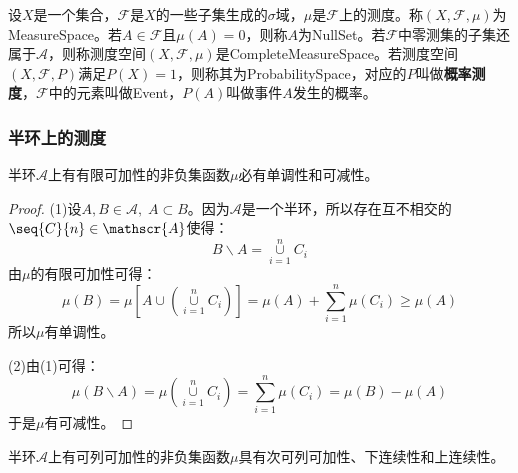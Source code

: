 \begin{definition}
	设$X$是一个集合，$\mathscr{F}$是$X$的一些子集生成的$\sigma$域，$\mu$是$\mathscr{F}$上的测度。称$(X,\mathscr{F},\mu)$为\gls{MeasureSpace}。若$A\in \mathscr{F}$且$\mu(A)=0$，则称$A$为\gls{NullSet}。若$\mathscr{F}$中零测集的子集还属于$\mathscr{A}$，则称测度空间$(X,\mathscr{F},\mu)$是\gls{CompleteMeasureSpace}。若测度空间$(X,\mathscr{F},P)$满足$P(X)=1$，则称其为\gls{ProbabilitySpace}，对应的$P$叫做\textbf{概率测度}，$\mathscr{F}$中的元素叫做\gls{Event}，$P(A)$叫做事件$A$发生的概率。
\end{definition}
\subsubsection{半环上的测度}
\begin{theorem}\label{theo:SemiringFiniteAdditivitySetfunction}
	半环$\mathscr{A}$上有有限可加性的非负集函数$\mu$必有单调性和可减性。
\end{theorem}
\begin{proof}
	(1)设$A,B\in\mathscr{A},\;A\subset B$。因为$\mathscr{A}$是一个半环，所以存在互不相交的$\seq{C}{n}\in \mathscr{A}$使得：
	\begin{equation*}
		B\backslash A=\underset{i=1}{\overset{n}{\cup}}C_i
	\end{equation*}
	由$\mu$的有限可加性可得：
	\begin{equation*}
		\mu(B)=\mu\left[A\cup\left(\underset{i=1}{\overset{n}{\cup}}C_i\right)\right]=\mu(A)+\sum_{i=1}^{n}\mu(C_i)\geqslant\mu(A)
	\end{equation*}
	所以$\mu$有单调性。\par
	(2)由(1)可得：
	\begin{equation*}
		\mu(B\backslash A)=\mu\left(\underset{i=1}{\overset{n}{\cup}}C_i\right)=\sum_{i=1}^{n}\mu(C_i)=\mu(B)-\mu(A)
	\end{equation*}
	于是$\mu$有可减性。
\end{proof}
\begin{theorem}\label{theo:SemiringCountableAdditivitySetFunction}
	半环$\mathscr{A}$上有可列可加性的非负集函数$\mu$具有次可列可加性、下连续性和上连续性。
\end{theorem}
